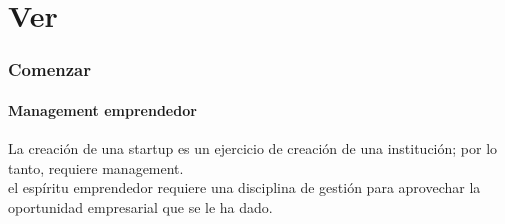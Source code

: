 \documentclass[10pt]{article}
\begin{document}
\part*{\center Ver}
\begin{multicols}{2}
\section*{Comenzar}
\subsection*{Management emprendedor}
La creación de una startup es un ejercicio de creación de una institución; por lo tanto, requiere management.\\
el espíritu emprendedor requiere una disciplina de gestión para aprovechar la oportunidad empresarial que se le ha dado.

\end{multicols}
\end{document}
